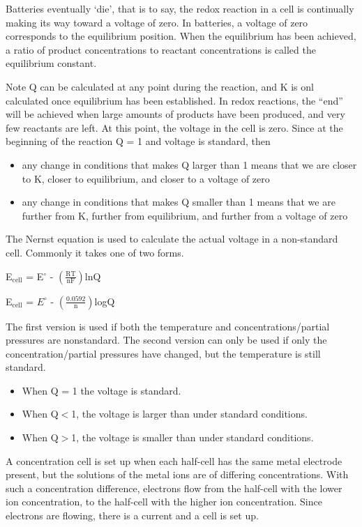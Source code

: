 \documentclass[../chem.tex]{subfiles}
\begin{document}
\begin{enumerate}
    Batteries eventually `die', that is to say, the redox reaction in a cell is continually making its way toward a voltage of zero. In batteries, a voltage of zero corresponds 
    to the equilibrium position. When the equilibrium has been achieved, a ratio of product concentrations to reactant concentrations is called the equilibrium constant. 

    Note Q can be calculated at any point during the reaction, and K is onl calculated once equilibrium has been established. In redox reactions, the 
    ``end'' will be achieved when large amounts of products have been produced, and very few reactants are left. At this point, the voltage in the cell is zero. Since 
    at the beginning of the reaction Q = 1 and voltage is standard, then 
    \begin{itemize}
        \item any change in conditions that makes Q larger than 1 means that we are closer to K, closer to equilibrium, and closer to a voltage of zero
        \item any change in conditions that makes Q smaller than 1 means that we are further from K, further from equilibrium, and further from a voltage of zero
    \end{itemize} 
\end{enumerate}
The Nernst equation is used to calculate the actual voltage in a non-standard cell. Commonly it takes one of two forms.
\begin{center}
    E$_{\text{cell}}$ = E$^{\circ}$ - $\left(\frac{\text{RT}}{\text{nF}}\right)$lnQ

    E$_{\text{cell}}$ = $E^{\circ}$ - $\left(\frac{0.0592}{\text{n}}\right)$logQ
\end{center}

The first version is used if both the temperature and concentrations/partial pressures are nonstandard. The second version can only be used 
if only the concentration/partial pressures have changed, but the temperature is still standard.
\begin{itemize}
    \item When Q = 1 the voltage is standard.
    \item When Q$<$1, the voltage is larger than under standard conditions.
    \item When Q$>$1, the voltage is smaller than under standard conditions.
\end{itemize}

A concentration cell is set up when each half-cell has the same metal electrode present, but the solutions of the metal ions are of differing concentrations.
With such a concentration difference, electrons flow from the half-cell with the lower ion concentration, to the half-cell with the higher 
ion concentration. Since electrons are flowing, there is a current and a cell is set up.
\end{document}
